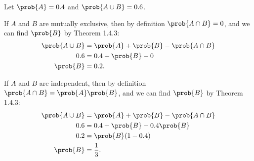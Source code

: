 \documentclass[11pt, newpage]{homework}
\begin{document}
Let \(\prob{A} = 0.4\) and \(\prob{A \cup B} = 0.6\).

\begin{alphaparts}
	\questionpart %
	If \(A\) and \(B\) are mutually exclusive, then by definition \(\prob{A \cap B} = 0\), and we can find \(\prob{B}\) by Theorem 1.4.3:
	\begin{align*}
		\prob{A \cup B} &= \prob{A} + \prob{B} - \prob{A \cap B} \\
		0.6 &= 0.4 + \prob{B} - 0 \\
		\prob{B} &= 0.2.\\
	\end{align*}

	\questionpart %
	If \(A\) and \(B\) are independent, then by definition \(\prob{A \cap B} = \prob{A}\prob{B}\), and we can find \(\prob{B}\) by Theorem 1.4.3:
	\begin{align*}
		\prob{A \cup B} &= \prob{A} + \prob{B} - \prob{A \cap B} \\
		0.6 &= 0.4 + \prob{B} - 0.4\prob{B}\\
		0.2 &= \prob{B}(1-0.4)\\
		\prob{B} &= \frac{1}{3}.\\
	\end{align*}
	
\end{alphaparts}
\end{document}
